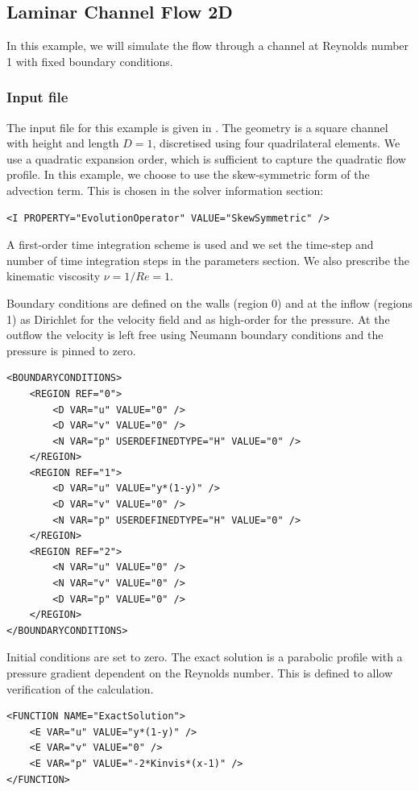 \subsection{Laminar Channel Flow 2D}
\label{s:incns:LaminarChannelFlow2D}
In this example, we will simulate the flow through a channel at Reynolds number
1 with fixed boundary conditions.

\subsubsection{Input file}
The input file for this example is given in . The
geometry is a square channel with height and length $D=1$, discretised using
four quadrilateral elements. We use a quadratic expansion order, which is
sufficient to capture the quadratic flow profile. In this example, we choose to
use the skew-symmetric form of the advection term. This is chosen in the solver
information section:
\begin{lstlisting}[style=XMLStyle]
<I PROPERTY="EvolutionOperator" VALUE="SkewSymmetric" />
\end{lstlisting}
A first-order time integration scheme is used and we set the time-step and
number of time integration steps in the parameters section. We also prescribe
the kinematic viscosity $\nu = 1/Re = 1$.

Boundary conditions are defined on the walls (region 0) and at the inflow
(regions 1) as Dirichlet for the velocity field and as high-order for the
pressure. At the outflow the velocity is left free using Neumann boundary
conditions and the pressure is pinned to zero.
\begin{lstlisting}[style=XMLStyle]
<BOUNDARYCONDITIONS>
    <REGION REF="0">
        <D VAR="u" VALUE="0" />
        <D VAR="v" VALUE="0" />
        <N VAR="p" USERDEFINEDTYPE="H" VALUE="0" />
    </REGION>
    <REGION REF="1">
        <D VAR="u" VALUE="y*(1-y)" />
        <D VAR="v" VALUE="0" />
        <N VAR="p" USERDEFINEDTYPE="H" VALUE="0" />
    </REGION>
    <REGION REF="2">
        <N VAR="u" VALUE="0" />
        <N VAR="v" VALUE="0" />
        <D VAR="p" VALUE="0" />
    </REGION>
</BOUNDARYCONDITIONS>
\end{lstlisting}

Initial conditions are set to zero. The exact solution is a parabolic profile
with a pressure gradient dependent on the Reynolds number. This is defined to
allow verification of the calculation.
\begin{lstlisting}[style=XMLStyle]
<FUNCTION NAME="ExactSolution">
    <E VAR="u" VALUE="y*(1-y)" />
    <E VAR="v" VALUE="0" />
    <E VAR="p" VALUE="-2*Kinvis*(x-1)" />
</FUNCTION>
\end{lstlisting}

